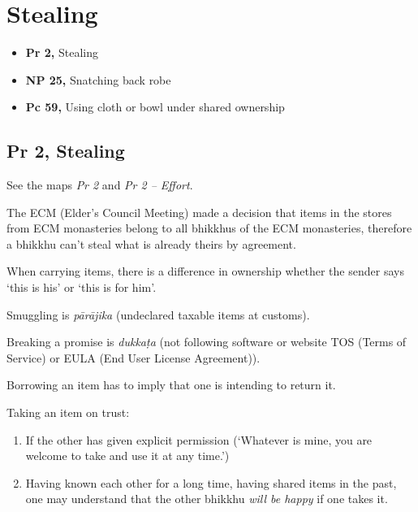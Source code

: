 \chapter{Stealing}

\begin{itemize}
\tightlist
\item
  \textbf{Pr 2,} Stealing
\item
  \textbf{NP 25,} Snatching back robe
\item
  \textbf{Pc 59,} Using cloth or bowl under shared ownership
\end{itemize}

\enlargethispage*{4\baselineskip}
\par
{}
\par
\vspace*{-2\baselineskip}

\section{Pr 2, Stealing}

See the maps \emph{Pr 2} and \emph{Pr 2 -- Effort}.

The ECM (Elder's Council Meeting) made a decision that items in the
stores from ECM monasteries belong to all bhikkhus of the ECM
monasteries, therefore a bhikkhu can't steal what is already theirs by
agreement.

When carrying items, there is a difference in ownership whether the
sender says `this is his' or `this is for him'.

Smuggling is \emph{pārājika} (undeclared taxable items at customs).

Breaking a promise is \emph{dukkaṭa} (not following software or website
TOS (Terms of Service) or EULA (End User License Agreement)).

Borrowing an item has to imply that one is intending to return it.

Taking an item on trust:

\begin{enumerate}
\def\labelenumi{\arabic{enumi}.}
\tightlist
\item
  If the other has given explicit permission (`Whatever is mine, you are
  welcome to take and use it at any time.')
\item
  Having known each other for a long time, having shared items in the
  past, one may understand that the other bhikkhu \emph{will be happy}
  if one takes it.
\end{enumerate}

